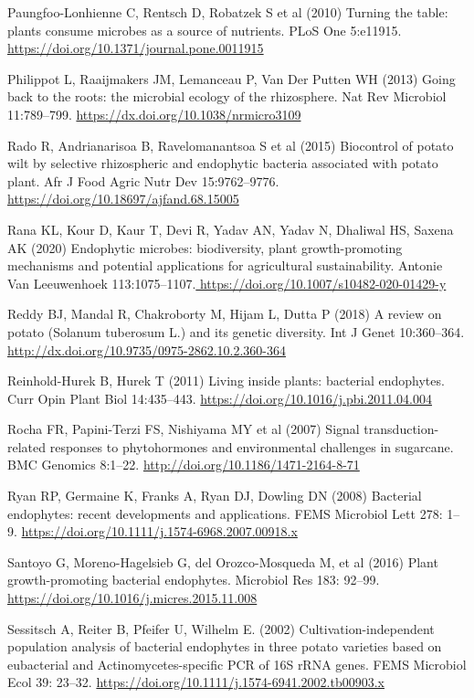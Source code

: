 \documentclass[sn-mathphys,Numbered]{sn-jnl}%
\theoremstyle{thmstyleone}%
\theoremstyle{thmstyletwo}%
\theoremstyle{thmstylethree}%
\begin{document}
Paungfoo-Lonhienne C, Rentsch D, Robatzek S et al (2010) Turning the table: plants consume microbes as a source of nutrients. PLoS One 5:e11915. \url{https://doi.org/10.1371/journal.pone.0011915}

Philippot L, Raaijmakers JM, Lemanceau P, Van Der Putten WH (2013) Going back to the roots: the microbial ecology of the rhizosphere. Nat Rev Microbiol 11:789–799. \url{https://dx.doi.org/10.1038/nrmicro3109}

Rado R, Andrianarisoa B, Ravelomanantsoa S et al (2015) Biocontrol of potato wilt by selective rhizospheric and endophytic bacteria associated with potato plant. Afr J Food Agric Nutr Dev 15:9762–9776. \url{https://doi.org/10.18697/ajfand.68.15005}

Rana KL, Kour D, Kaur T, Devi R, Yadav AN, Yadav N, Dhaliwal HS, Saxena AK (2020) Endophytic microbes: biodiversity, plant growth-promoting mechanisms and potential applications for agricultural sustainability. Antonie Van Leeuwenhoek 113:1075–1107.\url{ https://doi.org/10.1007/s10482-020-01429-y}

Reddy BJ, Mandal R, Chakroborty M, Hijam L, Dutta P (2018) A review on potato (Solanum tuberosum L.) and its genetic diversity. Int J Genet 10:360–364. \url{http://dx.doi.org/10.9735/0975-2862.10.2.360-364}

Reinhold-Hurek B, Hurek T (2011) Living inside plants: bacterial endophytes. Curr Opin Plant Biol 14:435–443. \url{https://doi.org/10.1016/j.pbi.2011.04.004}

Rocha FR, Papini-Terzi FS, Nishiyama MY et al (2007) Signal transduction-related responses to phytohormones and environmental challenges in sugarcane. BMC Genomics 8:1–22. \url{http://doi.org/10.1186/1471-2164-8-71}

Ryan RP, Germaine K, Franks A, Ryan DJ, Dowling DN (2008) Bacterial endophytes: recent developments and applications. FEMS Microbiol Lett 278: 1–9. \url{https://doi.org/10.1111/j.1574-6968.2007.00918.x}

Santoyo G, Moreno-Hagelsieb G, del Orozco-Mosqueda M, et al (2016) Plant growth-promoting bacterial endophytes. Microbiol Res 183: 92–99. \url{https://doi.org/10.1016/j.micres.2015.11.008}

Sessitsch A, Reiter B, Pfeifer U, Wilhelm E. (2002) Cultivation-independent population analysis of bacterial endophytes in three potato varieties based on eubacterial and Actinomycetes-specific PCR of 16S rRNA genes. FEMS Microbiol Ecol 39: 23–32. \url{https://doi.org/10.1111/j.1574-6941.2002.tb00903.x}
\end{document}
